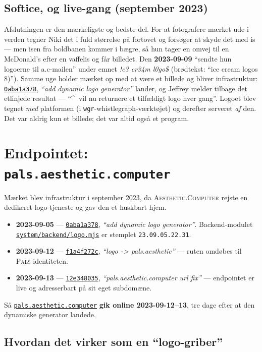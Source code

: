 \documentclass[10pt,letterpaper,twocolumn]{article}
\newcommand{\ac}{\textsc{Aesthetic}{\color{acpink}.}\textsc{Computer}}
\newcommand{\pals}{\textsc{Pals}}
\newcommand{\commit}[2]{\href{https://github.com/whistlegraph/aesthetic-computer/commit/#1}{\texttt{#1}}, \emph{``#2''}}
\newcommand{\repofile}[1]{\href{https://github.com/whistlegraph/aesthetic-computer/blob/main/#1}{\texttt{#1}}}
\begin{document}
\subsection{Softice, og live-gang (september 2023)}
Afslutningen er den mærkeligste og bedste del. For at fotografere mærket ude
i verden tegner Niki det i fuld størrelse på fortovet og forsøger at skyde
det med is --- men isen fra boldbanen kommer i bægre, så hun tager en omvej
til en McDonald's efter en vaffelis og får billedet. Den \textbf{2023-09-09}
``sendte hun logoerne til a.c-mailen'' under emnet \emph{!c3 cr34m l0go\$}
(brødtekst: ``ice cream logos 8)''). Samme uge holder mærket op med at være
et billede og bliver infrastruktur: \commit{0aba1a378}{add dynamic logo
generator} lander, og Jeffrey melder tilbage det etlinjede resultat ---
``\^{}\ vil nu returnere et tilfældigt logo hver gang''. Logoet blev tegnet
\emph{med} platformen (i \texttt{wgr}-whistlegraph-værktøjet) og derefter
serveret \emph{af} den. Det var aldrig kun et billede; det var altid også et
program.

\section{Endpointet: \texttt{pals.aesthetic.computer}}

Mærket blev infrastruktur i september 2023, da \ac{} rejste en dedikeret
logo-tjeneste og gav den et huskbart hjem.

\begin{itemize}
  \item \textbf{2023-09-05} --- \commit{0aba1a378}{add dynamic logo
        generator}. Backend-modulet \repofile{system/backend/logo.mjs}
        er stemplet \texttt{23.09.05.22.31}.
  \item \textbf{2023-09-12} --- \commit{f1a4f272c}{logo -> pals.aesthetic}
        --- ruten omdøbes til \pals{}-identiteten.
  \item \textbf{2023-09-13} --- \commit{12e348035}{pals.aesthetic.computer
        url fix} --- endpointet er live og adresserbart på sit eget
        subdomæne.
\end{itemize}

\noindent Så \href{https://pals.aesthetic.computer}{\texttt{pals.aesthetic.computer}}
\textbf{gik online 2023-09-12--13}, tre dage efter at den dynamiske generator
landede.

\subsection{Hvordan det virker som en ``logo-griber''}
\end{document}
